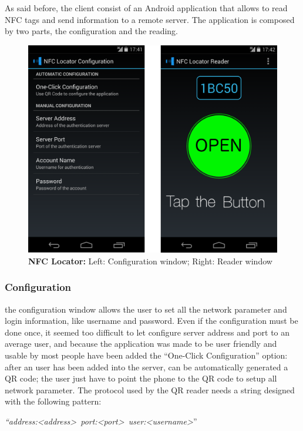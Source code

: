\documentclass[conference]{IEEEtran}
\begin{document}
As said before, the client consist of an Android application that allows to read NFC tags and send information to a remote server.
The application is composed by two parts, the configuration and the reading.

\begin{figure}[h]
\centering
\includegraphics[scale=0.15]{fig2}
\caption{\textbf{NFC Locator: }Left: Configuration window; Right: Reader window}
\label{client}
\end{figure}

\subsubsection{Configuration}

the configuration window allows the user to set all the network parameter and login information, like username and password.
Even if the configuration must be done once, it seemed too difficult to let configure server address and port to an average user, and because the application was made to be user friendly and usable by most people have been added the “One-Click Configuration” option: after an user has been added into the server, can be automatically generated a QR code; the user just have to point the phone to the QR code to setup all network parameter. The protocol used by the QR reader needs a string designed with the following pattern:
\begin{center}
\textit{``address:\textless address\textgreater\ port:\textless port\textgreater\ user:\textless username\textgreater}''
\end{center}
\end{document}
